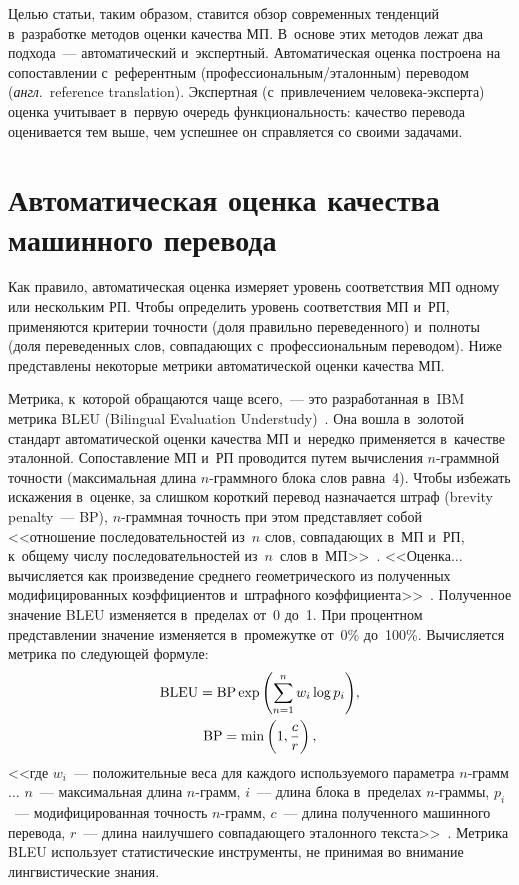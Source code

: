 \begin{multicols}{2}
  Целью статьи, таким образом, ставится обзор современных тенденций 
в~разработке методов оценки качества МП. В~основе этих методов лежат 
два подхода~--- автоматический и~экспертный. Автоматическая оценка 
построена на сопоставлении с~референтным
(про\-фес\-сио\-наль\-ным/эта\-лон\-ным) переводом (\textit{англ}.\ reference translation). Экспертная 
(с~привлечением че\-ло\-ве\-ка-экс\-пер\-та) оценка учитывает в~первую 
очередь функциональность: качество перевода оценивается тем выше, чем 
успешнее он справляется со своими задачами.

\vspace*{-9pt}
  
  \section{Автоматическая оценка качества машинного перевода}
  
  Как правило, автоматическая оценка измеряет уровень соответствия МП 
одному или нескольким РП. Чтобы определить уровень соответствия МП 
и~РП, применяются критерии точности (доля правильно переведенного) 
и~полноты (доля переведенных слов, совпадающих с~профессиональным 
переводом). Ниже представлены некоторые метрики автоматической оценки 
качества МП.
  
  Метрика, к~которой обращаются чаще всего,~--- это разработанная в~IBM 
метрика BLEU (Bilingual Evaluation Understudy)~\cite{6-nur}. Она вошла 
в~золотой стандарт автоматической оценки качества МП и~нередко 
применяется в~качестве эталонной. Сопоставление МП и~РП проводится 
путем вы\-чис\-ле\-ния $n$-грам\-мной точ\-ности (максимальная длина  
$n$-грам\-мно\-го блока слов равна~4). Чтобы избежать искажения в~оценке, 
за слишком короткий перевод назначается штраф (brevity penalty~--- BP),  
$n$-грам\-мная точ\-ность при этом представляет собой <<отношение 
последовательностей из~$n$ слов, совпадающих в~МП и~РП, к~общему числу 
последовательностей из~$n$~слов в~МП>>~\cite[с.~111--112]{7-nur}. 
<<Оценка$\ldots$ вычисляется как произведение среднего геометрического 
из полученных модифицированных коэффициентов и~штрафного 
коэффициента>>~\cite[с.~86]{8-nur}. Полученное значение BLEU изменяется 
в~пределах от~0 до~1. При процентном представлении значение изменяется 
в~промежутке от~0\% до~100\%. Вычисляется метрика по следующей 
формуле:
  \begin{multline*}
  \mathrm{BLEU} =\mathrm{BP}\exp \left( \sum\limits^n_{n=1} w_i \log 
p_i\right) \!,\\
 \mathrm{BP} =\min\left( 1,\displaystyle\frac{\displaystyle c\mathstrut}{\displaystyle r\mathstrut}\right),
  \end{multline*}
  <<где $w_i$~--- положительные веса для каждого используемого параметра  
$n$-грамм$\ldots$ $n$~--- максимальная длина $n$-грамм, $i$~--- длина 
блока в~пределах $n$-грам\-мы, $p_i$~--- модифицированная точность  
$n$-грамм, $c$~--- длина полученного машинного перевода, $r$~--- длина 
наилучшего совпадающего эталонного текста>>~\cite[с.~86]{8-nur}. Мет\-ри\-ка BLEU 
использует статистические инструменты, не принимая во внимание 
лингвистические знания.
  

\end{multicols}
